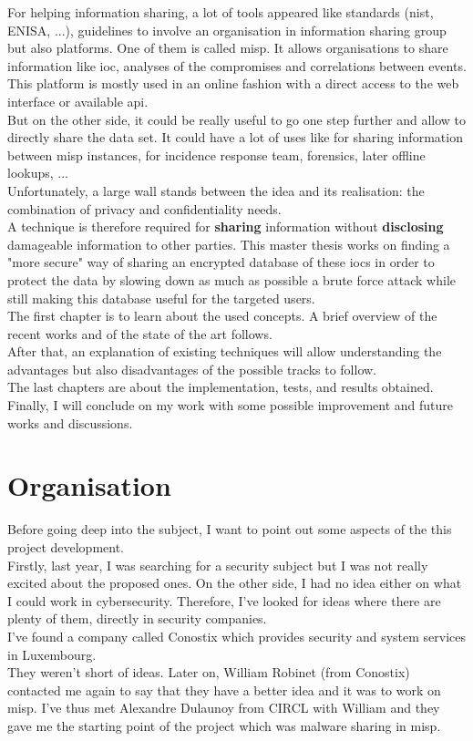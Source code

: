 \documentclass{eplmastersthesis}
\begin{document}
For helping information sharing, a lot of tools appeared like standards (\gls{nist}, ENISA, ...), guidelines to involve an organisation in information sharing group but also platforms. One of them is called \gls{misp}. It allows organisations to share information like \gls{ioc}, analyses of the compromises and correlations between events.\\
This platform is mostly used in an online fashion with a direct access to the web interface or available \gls{api}.\\
But on the other side, it could be really useful to go one step further and allow to directly share the data set. It could have a lot of uses like for sharing information between \gls{misp} instances, for incidence response team, forensics, later offline lookups, ...\\
Unfortunately, a large wall stands between the idea and its realisation: the combination of privacy and confidentiality needs.\\ 
A technique is therefore required for \textbf{sharing} information without \textbf{disclosing} damageable information to other parties. This master thesis works on finding a "more secure" way of sharing an encrypted database of these \gls{ioc}s in order to protect the data by slowing down as much as possible a brute force attack while still making this database useful for the targeted users.\\

The first chapter is to learn about the used concepts. A brief overview of the recent works and of the state of the art follows.\\
After that, an explanation of existing techniques will allow understanding the advantages but also disadvantages of the possible tracks to follow.\\

The last chapters are about the implementation, tests, and results obtained.\\
Finally, I will conclude on my work with some possible improvement and future works and discussions.

\section{Organisation}
Before going deep into the subject, I want to point out some aspects of the this project development.\\
Firstly, last year, I was searching for a security subject but I was not really excited about the proposed ones. On the other side, I had no idea either on what I could work in cybersecurity. Therefore, I've looked for ideas where there are plenty of them, directly in security companies.\\
I've found a company called Conostix which provides security and system services in Luxembourg.\\
They weren't short of ideas. Later on, William Robinet (from Conostix) contacted me again to say that they have a better idea and it was to work on \gls{misp}. I've thus met Alexandre Dulaunoy from CIRCL with William and they gave me the starting point of the project which was malware sharing in \gls{misp}.\\
\end{document}
